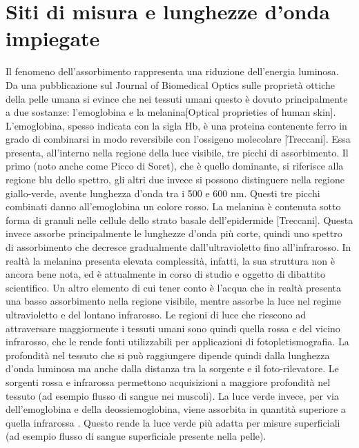 \section{Siti di misura e lunghezze d'onda impiegate}
Il fenomeno dell'assorbimento rappresenta una riduzione dell'energia luminosa.
Da una pubblicazione sul Journal of Biomedical Optics sulle proprietà ottiche della pelle umana si evince che nei tessuti umani questo è dovuto principalmente a due sostanze: l'emoglobina e la melanina[Optical proprieties of human skin].
L'emoglobina, spesso indicata con la sigla Hb, è una proteina contenente ferro in grado di combinarsi in modo reversibile con l’ossigeno molecolare [Treccani]. Essa presenta, all'interno nella regione della luce visibile, tre picchi di assorbimento. Il primo (noto anche come Picco di Soret), che è quello dominante, si riferisce alla regione blu dello spettro, gli altri due invece si possono distinguere nella regione giallo-verde, avente lunghezza d'onda tra i 500 e 600 nm. Questi tre picchi combinati danno all'emoglobina un colore rosso.
La melanina è contenuta sotto forma di granuli nelle cellule dello strato basale dell’epidermide [Treccani]. Questa invece assorbe principalmente le lunghezze d'onda più corte, quindi uno spettro di assorbimento che decresce gradualmente dall'ultravioletto fino all'infrarosso. In realtà la melanina presenta elevata complessità, infatti, la sua struttura non è ancora bene nota, ed è attualmente in corso di studio e oggetto di dibattito scientifico.
Un altro elemento di cui tener conto è l'acqua che in realtà presenta una basso assorbimento nella regione visibile, mentre assorbe la luce nel regime ultravioletto e del lontano infrarosso. Le regioni di luce che riescono ad attraversare maggiormente i tessuti umani sono quindi quella rossa e del vicino infrarosso, che le rende fonti utilizzabili per applicazioni di fotopletismografia.
La profondità nel tessuto che si può raggiungere dipende quindi dalla lunghezza d'onda luminosa ma anche dalla distanza tra la sorgente e il foto-rilevatore. Le sorgenti rossa e infrarossa permettono acquisizioni a maggiore profondità nel tessuto (ad esempio flusso di sangue nei muscoli). La luce verde invece, per via dell'emoglobina e della deossiemoglobina, viene assorbita in quantità superiore a quella infrarossa \cite{Lee2021}. Questo rende la luce verde più adatta per misure superficiali (ad esempio flusso di sangue superficiale presente nella pelle).

 